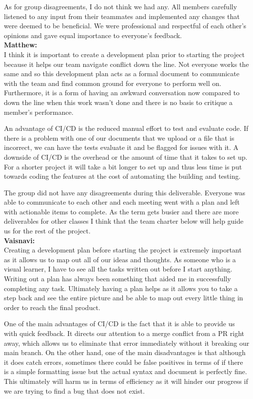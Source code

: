 \documentclass{article}
\begin{document}
As for group disagreements, I do not think we had any. All members carefully listened to any input from their teammates and implemented any changes that were deemed to be beneficial. We were professional and respectful of each other’s opinions and gave equal importance to everyone’s feedback. \\


\noindent \textbf{Matthew:}\\
I think it is important to create a development plan prior to starting the project because it helps our team navigate conflict down the line. Not everyone works the same and so this development plan acts as a formal document to communicate with the team and find common ground for everyone to perform well on. Furthermore, it is a form of having an awkward conversation now compared to down the line when this work wasn't done and there is no basis to critique a member's performance. 

An advantage of CI/CD is the reduced manual effort to test and evaluate code. If there is a problem with one of our documents that we upload or a file that is incorrect, we can have the tests evaluate it and be flagged for issues with it. A downside of CI/CD is the overhead or the amount of time that it takes to set up. For a shorter project it will take a bit longer to set up and thus less time is put towards coding the features at the cost of automating the building and testing.

The group did not have any disagreements during this deliverable. Everyone was able to communicate to each other and each meeting went with a plan and left with actionable items to complete. As the term gets busier and there are more deliverables for other classes I think that the team charter below will help guide us for the rest of the project. \\

\noindent \textbf{Vaisnavi:} \\
Creating a development plan before starting the project is extremely important as it allows us to map out all of our ideas and thoughts. As someone who is a visual learner, I have to see all the tasks written out before I start anything. Writing out a plan has always been something that aided me in successfully completing any task. Ultimately having a plan helps as it allows you to take a step back and see the entire picture and be able to map out every little thing in order to reach the final product.


One of the main advantages of CI/CD is the fact that it is able to provide us with quick feedback. It directs our attention to a merge conflict from a PR right away, which allows us to eliminate that error immediately without it breaking our main branch. On the other hand, one of the main disadvantages is that although it does catch errors, sometimes there could be false positives in terms of if there is a simple formatting issue but the actual syntax and document is perfectly fine. This ultimately will harm us in terms of efficiency as it will hinder our progress if we are trying to find a bug that does not exist.
\end{document}
